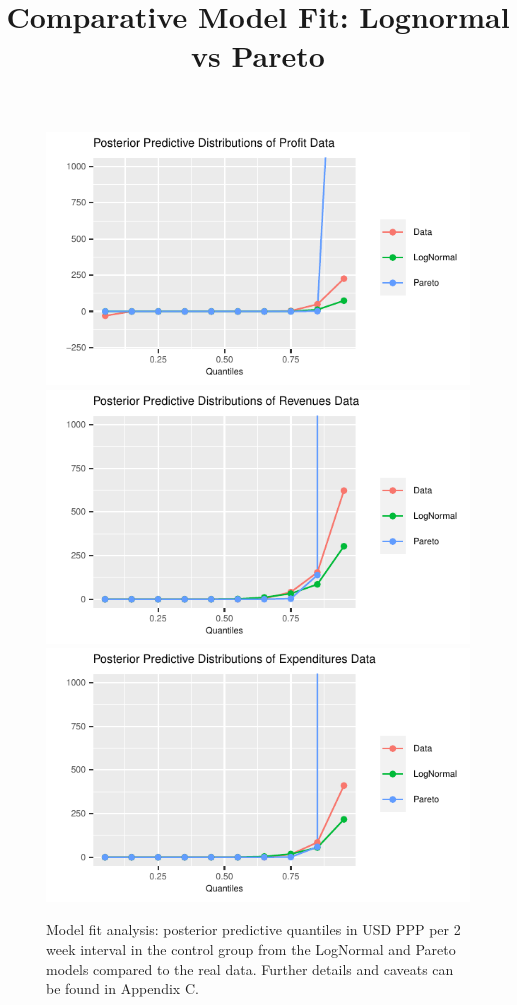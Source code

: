 \documentclass[english,12pt]{article}\usepackage{lmodern}
\numberwithin{equation}{section}
\begin{document}
 
  \begin{figure}[h!]
  \centering
  \title{Comparative Model Fit: Lognormal vs Pareto}
    \includegraphics[scale=0.4]{posterior_predictive_profit.pdf}\\
    \includegraphics[scale=0.4]{posterior_predictive_revenues.pdf}\\
          \includegraphics[scale=0.4]{posterior_predictive_expenditures.pdf}

  \caption{Model fit analysis: posterior predictive quantiles in USD PPP per 2 week interval in the control group from the LogNormal and Pareto models compared to the real data. Further details and caveats can be found in Appendix C. }\label{model fit}
\end{figure}
\end{document}
